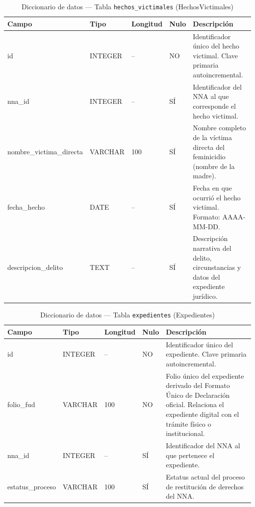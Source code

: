 \begin{table}[H]
	\centering
	\caption{Diccionario de datos --- Tabla \texttt{hechos\_victimales} (HechosVictimales)}
	\label{tab:data-dict-hechos_victimales}
	\scriptsize
	\begin{tabular}{>{\ttfamily\raggedright\arraybackslash}p{3.6cm} p{1.6cm} p{1.3cm} p{0.7cm} p{5.6cm}}
		\toprule
		\textbf{Campo} & \textbf{Tipo} & \textbf{Longitud} & \textbf{Nulo} & \textbf{Descripción} \\
		\midrule
		id & INTEGER & -- & NO & Identificador único del hecho victimal. Clave primaria autoincremental. \\
		nna\_id & INTEGER & -- & SÍ & Identificador del NNA al que corresponde el hecho victimal. \\
		nombre\_victima\_directa & VARCHAR & 100 & SÍ & Nombre completo de la víctima directa del feminicidio (nombre de la madre). \\
		fecha\_hecho & DATE & -- & SÍ & Fecha en que ocurrió el hecho victimal. Formato: AAAA-MM-DD. \\
		descripcion\_delito & TEXT & -- & SÍ & Descripción narrativa del delito, circunstancias y datos del expediente jurídico. \\
		\bottomrule
	\end{tabular}
\end{table}

\begin{table}[H]
	\centering
	\caption{Diccionario de datos --- Tabla \texttt{expedientes} (Expedientes)}
	\label{tab:data-dict-expedientes}
	\scriptsize
	\begin{tabular}{>{\ttfamily\raggedright\arraybackslash}p{3.6cm} p{1.6cm} p{1.3cm} p{0.7cm} p{5.6cm}}
		\toprule
		\textbf{Campo} & \textbf{Tipo} & \textbf{Longitud} & \textbf{Nulo} & \textbf{Descripción} \\
		\midrule
		id & INTEGER & -- & NO & Identificador único del expediente. Clave primaria autoincremental. \\
		folio\_fud & VARCHAR & 100 & NO & Folio único del expediente derivado del Formato Único de Declaración oficial. Relaciona el expediente digital con el trámite físico o institucional. \\
		nna\_id & INTEGER & -- & SÍ & Identificador del NNA al que pertenece el expediente. \\
		estatus\_proceso & VARCHAR & 100 & SÍ & Estatus actual del proceso de restitución de derechos del NNA. \\
		\bottomrule
	\end{tabular}
\end{table}

